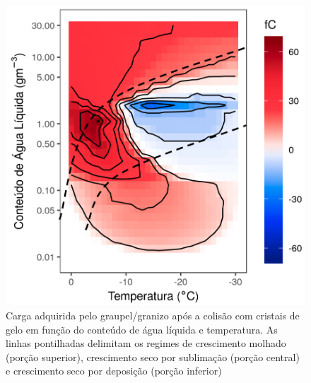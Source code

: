 \begin{figure}[htb]
	\begin{center}
		\caption{Carga adquirida pelo graupel/granizo após a colisão com cristais de gelo em função do conteúdo de água líquida e temperatura. As linhas pontilhadas delimitam os regimes de crescimento molhado (porção superior), crescimento seco por sublimação (porção central) e crescimento seco por deposição (porção inferior)} 
		\label{takahashi}
		\includegraphics[width=0.6\columnwidth]{figs/takahashi_williams_ptbr.png}
	\end{center}
\end{figure}

